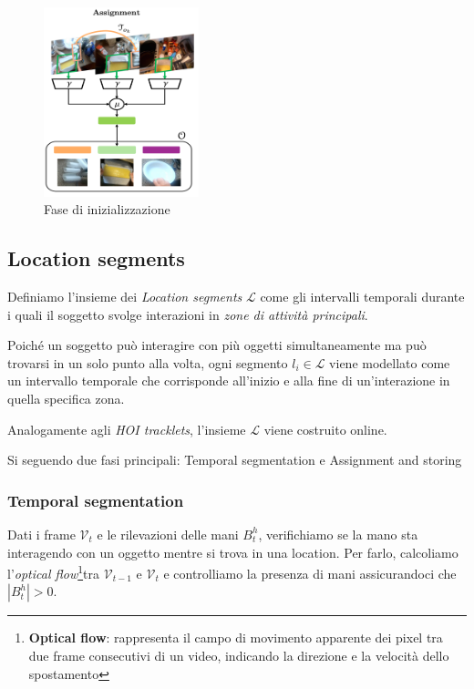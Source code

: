 \begin{figure}[ht]
    \centering
    \includegraphics[width=0.4\textwidth]{Images/assign_store.png}
    \caption{Fase di inizializzazione}
    \label{fig:store}
\end{figure}

\subsection*{Location segments}
Definiamo l'insieme dei \emph{Location segments} $\mathcal{L}$ come gli intervalli temporali durante i quali il soggetto svolge interazioni in \emph{zone di attività principali}.

Poiché un soggetto può interagire con più oggetti simultaneamente ma può trovarsi in un solo punto alla volta, ogni segmento $l_i \in \mathcal{L}$ viene modellato come un intervallo temporale che corrisponde all'inizio e alla fine di un'interazione in quella specifica zona.  

Analogamente agli \emph{HOI tracklets}, l'insieme $\mathcal{L}$ viene costruito online.

Si seguendo due fasi principali: Temporal segmentation e Assignment and storing

\subsubsection*{Temporal segmentation}
Dati i frame $\mathcal{V}_t$ e le rilevazioni delle mani $B_t^h$, verifichiamo se la mano sta interagendo con un oggetto mentre si trova in una location. Per farlo, calcoliamo l'\emph{optical flow}\footnote{\textbf{Optical flow}: rappresenta il campo di movimento apparente dei pixel tra due frame consecutivi di un video, indicando la direzione e la velocità dello spostamento}tra $\mathcal{V}_{t-1}$ e $\mathcal{V}_t$ e controlliamo la presenza di mani assicurandoci che $|B_t^h|>0$.

